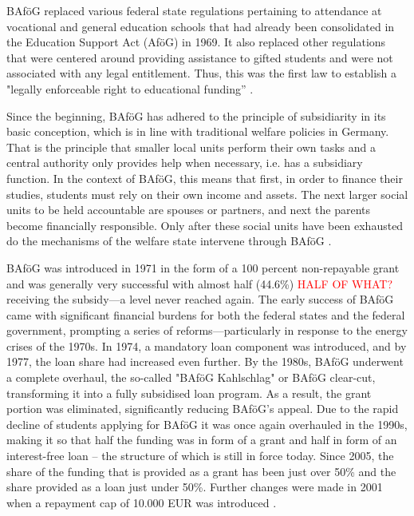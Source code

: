 BAföG replaced various federal state regulations pertaining to attendance at vocational and general education schools that had already been consolidated in the Education Support Act (AföG) in 1969. It also replaced other regulations that were centered around providing assistance to gifted students and were not associated with any legal entitlement. Thus, this was the first law to establish a "legally enforceable right to educational funding” \citep{staack_von_2017}.

Since the beginning, BAföG has adhered to the principle of subsidiarity in its basic conception, which is in line with traditional welfare policies in Germany. That is the principle that smaller local units perform their own tasks and a central authority only provides help when necessary, i.e. has a subsidiary function. In the context of BAföG, this means that first, in order to finance their studies, students must rely on their own income and assets. The next larger social units to be held accountable are spouses or partners, and next the parents become financially responsible. Only after these social units have been exhausted do the mechanisms of the welfare state intervene through BAföG \citep{staack_von_2017}.

BAföG was introduced in 1971 in the form of a 100 percent non-repayable grant and was generally very successful with almost half (44.6\%) \textcolor{red}{HALF OF WHAT?} receiving the subsidy---a level never reached again. 
The early success of BAföG came with significant financial burdens for both the federal states and the federal government, prompting a series of reforms—particularly in response to the energy crises of the 1970s. In 1974, a mandatory loan component was introduced, and by 1977, the loan share had increased even further. By the 1980s, BAföG underwent a complete overhaul, the so-called "BAföG Kahlschlag" or BAföG clear-cut, transforming it into a fully subsidised loan program. As a result, the grant portion was eliminated, significantly reducing BAföG's appeal. Due to the rapid decline of students applying for BAföG it was once again overhauled in the 1990s, making it so that half the funding was in form of a grant and half in form of an interest-free loan -- the structure of which is still in force today. Since 2005, the share of the funding that is provided as a grant has been just over 50\% and the share provided as a loan just under 50\%. Further changes were made in 2001 when a repayment cap of 10.000 EUR was introduced  \citep{lost_geschichte_2025, staack_von_2017, meier_zur_2024}.

